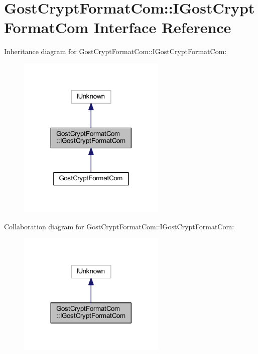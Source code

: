 \hypertarget{interface_gost_crypt_format_com_1_1_i_gost_crypt_format_com}{}\section{Gost\+Crypt\+Format\+Com\+:\+:I\+Gost\+Crypt\+Format\+Com Interface Reference}
\label{interface_gost_crypt_format_com_1_1_i_gost_crypt_format_com}


Inheritance diagram for Gost\+Crypt\+Format\+Com\+:\+:I\+Gost\+Crypt\+Format\+Com\+:
\nopagebreak
\begin{figure}[H]
\begin{center}
\leavevmode
\includegraphics[width=200pt]{interface_gost_crypt_format_com_1_1_i_gost_crypt_format_com__inherit__graph}
\end{center}
\end{figure}


Collaboration diagram for Gost\+Crypt\+Format\+Com\+:\+:I\+Gost\+Crypt\+Format\+Com\+:
\nopagebreak
\begin{figure}[H]
\begin{center}
\leavevmode
\includegraphics[width=200pt]{interface_gost_crypt_format_com_1_1_i_gost_crypt_format_com__coll__graph}
\end{center}
\end{figure}
